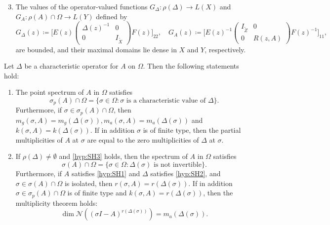 \documentclass[english]{myarticle}
\begin{document}
\begin{sloppypar}
\begin{enumerate}[label=({SH}{{\arabic*}})]
\setcounter{enumi}{2}
    \item \label{hyp:SH3} The values of the operator-valued functions $G_\Delta : \rho(\Delta) \to L(X)$ and $G_{A} : \rho(A) \cap \Omega \to L(Y)$ defined by
    \begin{equation*}
        G_\Delta(z) \coloneqq \bigg[E(z)
        \begin{pmatrix}
            \Delta(z)^{-1} & 0 \\
            0 & I_{\tilde{X}}
        \end{pmatrix}
        F(z) \bigg]_{22}, \quad G_A(z) \coloneqq \bigg[E(z)^{-1}
        \begin{pmatrix}
            I_{\tilde{Z}} & 0 \\
            0 & R(z,A)
        \end{pmatrix}
        F(z)^{-1} \bigg]_{11},
    \end{equation*}
are bounded, and their maximal domains lie dense in $X$ and $Y$, respectively.
\end{enumerate}

\begin{theorem} \label{thm:spectralequal}
Let $\Delta$ be a characteristic operator for $A$ on $\Omega$. Then the following statements hold:
\begin{enumerate}
    \item The point spectrum of $A$ in $\Omega$ satisfies
    \begin{equation} \label{eq:pointspectrumsigmaADelta}
        \sigma_p(A) \cap \Omega = \{ \sigma \in \Omega : \sigma \mbox{ is a characteristic value of } \Delta \}.
    \end{equation}
    Furthermore, if $\sigma \in \sigma_p(A) \cap \Omega$, then $m_g(\sigma,A) = m_g(\Delta(\sigma)), m_a(\sigma,A) = m_a(\Delta(\sigma))$ and $k(\sigma,A) = k(\Delta(\sigma))$. If in addition $\sigma$ is of finite type, then the partial multiplicities of $A$ at $\sigma$ are equal to the zero multiplicities of $\Delta$ at $\sigma$.

    \item If $\rho(\Delta) \neq \emptyset$ and \ref{hyp:SH3} holds, then the spectrum of $A$ in $\Omega$ satisfies
    \begin{equation} \label{eq:spectrumsigmaADelta}
        \sigma(A) \cap \Omega = \{ \sigma \in \Omega : \Delta(\sigma) \mbox{ is not invertible} \}.
    \end{equation}
    Furthermore, if $A$ satisfies \ref{hyp:SH1} and $\Delta$ satisfies \ref{hyp:SH2}, and $\sigma \in \sigma(A) \cap \Omega$ is isolated, then $r(\sigma,A) = r(\Delta(\sigma))$. If in addition $\sigma \in \sigma_p(A) \cap \Omega$ is of finite type and $k(\sigma,A) = r(\Delta(\sigma))$, then the multiplicity theorem holds:
    \begin{equation} \label{eq:multiplicitythm}
        \dim \mathcal{N}((\sigma I - A)^{r(\Delta(\sigma))}) = m_a(\Delta(\sigma)).
    \end{equation}
\end{enumerate}
\end{theorem}


\end{sloppypar}
\end{document}
